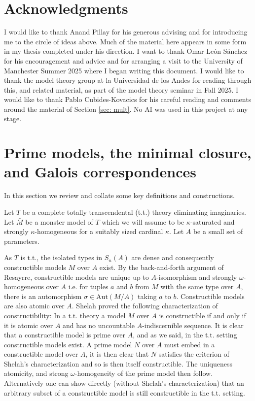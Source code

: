 \documentclass{amsart}
\theoremstyle{definition}
\theoremstyle{remark}
\numberwithin{equation}{section}
\def \aut {\text{Aut}}
\begin{document}


\section{Acknowledgments} 

I would like to thank Anand Pillay for his generous advising and for introducing me to the circle of ideas above. Much of the material here appears in some form in my thesis completed under his direction. I want to thank Omar León Sánchez for his encouragement and advice and for arranging a visit to the University of Manchester Summer 2025 where I began writing this document. I would like to thank the model theory group at la Universidad de los Andes for reading through this, and related material, as part of the model theory seminar in Fall 2025. I would like to thank Pablo Cubides-Kovacics for his careful reading and comments around the material of Section \ref{sec: mult}. No AI was used in this project at any stage.

\section{Prime models, the minimal closure, and Galois correspondences}\label{sec: min}

In this section we review and collate some key definitions and constructions. 

Let $T$ be a complete totally transcendental (t.t.) theory eliminating imaginaries. Let $\bar{M}$ be a monster model of $T$ which we will assume to be $\kappa$-saturated and strongly $\kappa$-homogeneous for a suitably sized cardinal $\kappa$. Let $A$ be a small set of parameters.

As $T$ is t.t., the isolated types in $S_n(A)$ are dense and consequently constructible models $M$ over $A$ exist. By the back-and-forth argument of Resayrre, constructible models are unique up to $A$-isomorphism and strongly $\omega$-homogeneous over $A$ i.e. for tuples $a$ and $b$ from $M$ with the same type over $A$, there is an automorphism $\sigma \in \aut(M/A)$ taking $a$ to $b$. Constructible models are also atomic over $A$. Shelah proved the following characterization of constructibility:  In a t.t. theory a model $M$ over $A$ is constructible if and only if it is atomic over $A$ and has no uncountable $A$-indiscernible sequence. It is clear that a constructible model is prime over $A$, and as we said, in the t.t. setting constructible models exist. A prime model $N$ over $A$ must embed in a constructible model over $A$, it is then clear that $N$ satisfies the criterion of Shelah's characterization and so is then itself constructible. The uniqueness atomicity, and strong $\omega$-homogeneity of the prime model then follow. Alternatively one can show directly (without Shelah's characterization) that an arbitrary subset of a constructible model is still constructible in the t.t. setting.
\end{document}
